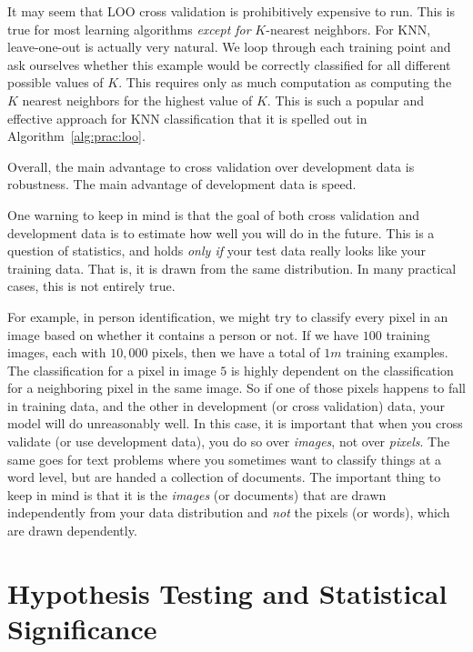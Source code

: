 It may seem that LOO cross validation is prohibitively expensive to
run.  This is true for most learning algorithms \emph{except for}
$K$-nearest neighbors.  For KNN, leave-one-out is actually very
natural.  We loop through each training point and ask ourselves
whether this example would be correctly classified for all different
possible values of $K$.  This requires only as much computation as
computing the $K$ nearest neighbors for the highest value of $K$.
This is such a popular and effective approach for KNN classification
that it is spelled out in Algorithm~\ref{alg:prac:loo}.

Overall, the main advantage to cross validation over development data
is robustness.  The main advantage of development data is speed.

One warning to keep in mind is that the goal of both cross validation
and development data is to estimate how well you will do in the
future.  This is a question of statistics, and holds \emph{only if}
your test data really looks like your training data.  That is, it is
drawn from the same distribution.  In many practical cases, this is
not entirely true.

For example, in person identification, we might try to classify every
pixel in an image based on whether it contains a person or not.  If we
have $100$ training images, each with $10,000$ pixels, then we have a
total of $1m$ training examples.  The classification for a pixel in
image $5$ is highly dependent on the classification for a neighboring
pixel in the same image.  So if one of those pixels happens to fall in
training data, and the other in development (or cross validation)
data, your model will do unreasonably well.  In this case, it is
important that when you cross validate (or use development data), you
do so over \emph{images}, not over \emph{pixels}.  The same goes for
text problems where you sometimes want to classify things at a word
level, but are handed a collection of documents.  The important thing
to keep in mind is that it is the \emph{images} (or documents) that
are drawn independently from your data distribution and \emph{not} the
pixels (or words), which are drawn dependently.

\section{Hypothesis Testing and Statistical Significance}


